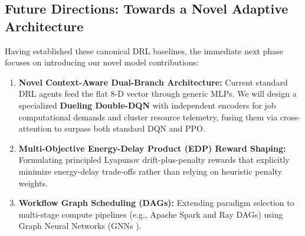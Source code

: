 \documentclass[11pt,a4paper]{article}
\begin{document}
\subsection{Future Directions: Towards a Novel Adaptive Architecture}
Having established these canonical DRL baselines, the immediate next phase focuses on introducing our novel model contributions:
\begin{enumerate}[noitemsep, topsep=1pt]
    \item \textbf{Novel Context-Aware Dual-Branch Architecture:} Current standard DRL agents feed the flat 8-D vector through generic MLPs. We will design a specialized \textbf{Dueling Double-DQN} with independent encoders for job computational demands and cluster resource telemetry, fusing them via cross-attention to surpass both standard DQN and PPO.
    \item \textbf{Multi-Objective Energy-Delay Product (EDP) Reward Shaping:} Formulating principled Lyapunov drift-plus-penalty rewards that explicitly minimize energy-delay trade-offs rather than relying on heuristic penalty weights.
    \item \textbf{Workflow Graph Scheduling (DAGs):} Extending paradigm selection to multi-stage compute pipelines (e.g., Apache Spark and Ray DAGs) using Graph Neural Networks (GNNs \cite{mao2019decima}).
\end{enumerate}
\end{document}

